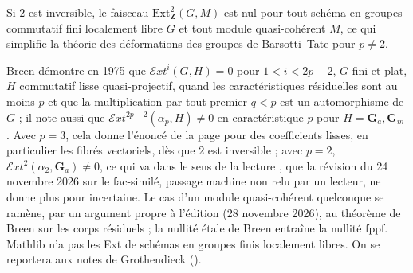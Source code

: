 
\begin{encadre}
\begin{theoreme*}\nonverifie
Si $2$ est inversible, le faisceau $\mathrm{Ext}^2_{\mathbf Z}(G, M)$ est nul pour tout schéma en groupes commutatif fini localement libre $G$ et tout module quasi-cohérent $M$, ce qui simplifie la théorie des déformations des groupes de Barsotti--Tate pour $p \neq 2$.
\end{theoreme*}
\end{encadre}
{\small Breen démontre en 1975 que $\mathcal Ext^i(G, H) = 0$ pour $1 < i < 2p - 2$, $G$ fini et plat, $H$ commutatif lisse quasi-projectif, quand les caractéristiques résiduelles sont au moins $p$ et que la multiplication par tout premier $q < p$ est un automorphisme de $G$ ; il note aussi que $\mathcal Ext^{2p-2}(\alpha_p, H) \neq 0$ en caractéristique $p$ pour $H = \mathbf G_a, \mathbf G_m$ \cite{breen1975}. Avec $p = 3$, cela donne l'énoncé de la page pour des coefficients lisses, en particulier les fibrés vectoriels, dès que $2$ est inversible ; avec $p = 2$, $\mathcal Ext^2(\alpha_2, \mathbf G_a) \neq 0$, ce qui va dans le sens de la lecture , que la révision du 24 novembre 2026 sur le fac-similé, passage machine non relu par un lecteur, ne donne plus pour incertaine. Le cas d'un module quasi-cohérent quelconque se ramène, par un argument propre à l'édition (28 novembre 2026), au théorème de Breen sur les corps résiduels ; la nullité étale de Breen entraîne la nullité fppf. Mathlib n'a pas les Ext de schémas en groupes finis localement libres. On se reportera aux notes de Grothendieck ().\par}
